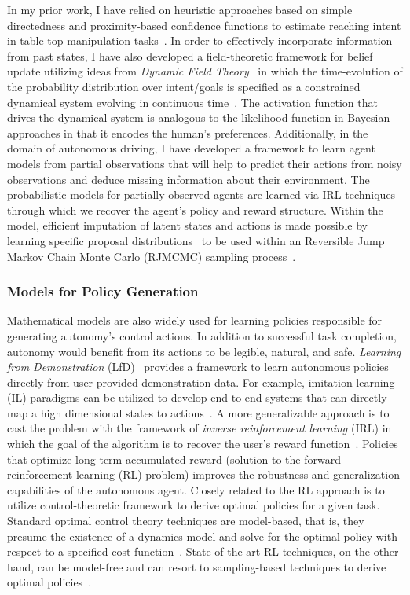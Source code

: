 \documentclass[12pt]{article}
\begin{document}
In my prior work, I have relied on heuristic approaches based on simple directedness and proximity-based confidence functions to estimate reaching intent in table-top manipulation tasks~\cite{gopinath2017human}. In order to effectively incorporate information from past states, I have also developed a field-theoretic framework for belief update utilizing ideas from \textit{Dynamic Field Theory}~\cite{schoner1995dynamics} in which the time-evolution of the probability distribution over intent/goals is specified as a constrained dynamical system evolving in continuous time~\cite{gopinathdynamic}. The activation function that drives the dynamical system is analogous to the likelihood function in Bayesian approaches in that it encodes the human's preferences. Additionally, in the domain of autonomous driving, I have developed a framework to learn agent models from partial observations that will help to predict their actions from noisy observations and deduce missing information about their environment. The probabilistic models for partially observed agents are learned via IRL techniques through which we recover the agent's policy and reward structure. Within the model, efficient imputation of latent states and actions is made possible by learning specific proposal distributions~\cite{gu2015neural} to be used within an Reversible Jump Markov Chain Monte Carlo (RJMCMC) sampling process~\cite{green1995reversible}. 



\subsubsection{Models for Policy Generation}

Mathematical models are also widely used for learning policies responsible for generating autonomy's control actions. In addition to successful task completion, autonomy would benefit from its actions to be legible, natural, and safe. \textit{Learning from Demonstration} (LfD)~\cite{argall2009survey} provides a framework to learn autonomous policies directly from user-provided demonstration data. For example, imitation learning (IL) paradigms can be utilized to develop end-to-end systems that can directly map a high dimensional states to actions~\cite{bojarski2016end}. A more generalizable approach is to cast the problem with the framework of \textit{inverse reinforcement learning} (IRL) in which the goal of the algorithm is to recover the user's reward function~\cite{ziebart2008maximum}.  Policies that optimize long-term accumulated reward (solution to the forward reinforcement learning (RL) problem) improves the robustness and generalization capabilities of the autonomous agent. Closely related to the RL approach is to utilize control-theoretic framework to derive optimal policies for a given task. Standard optimal control theory techniques are model-based, that is, they presume the existence of a dynamics model and solve for the optimal policy with respect to a specified cost function~\cite{kirk1970optimal}. State-of-the-art RL techniques, on the other hand, can be model-free and can resort to sampling-based techniques to derive optimal policies~\cite{watkins1992q}. 
\end{document}

